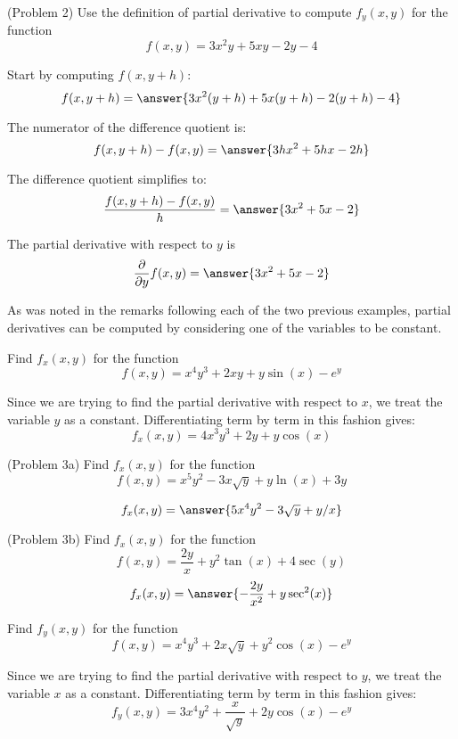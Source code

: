 \documentclass[handout]{ximera}
\begin{document}
\begin{problem}(Problem 2)
Use the definition of partial derivative to compute $f_y(x,y)$ for the function
\[
f(x,y) = 3x^2y + 5xy - 2y - 4
\]

Start by computing $f(x, y+h)$:
\[
f(x, y+h) = \answer{3x^2(y+h) + 5x(y+h) - 2(y+h) - 4}
\]

The numerator of the difference quotient is:
\[
f(x,y+h) - f(x,y) = \answer{3hx^2 + 5hx - 2h}
\]

The difference quotient simplifies to:
\[
\frac{f(x,y+h) - f(x,y)}{h} = \answer{3x^2 + 5x -2}
\]

The partial derivative with respect to $y$ is
\[
\frac{\partial}{\partial y} f(x,y) = \answer{3x^2 + 5x -2}
\]
\end{problem}

As was noted in the remarks following each of the two previous examples, partial derivatives can be computed by considering one of the variables to be constant.

\begin{example}[Example 3]
Find $f_x(x,y)$ for the function 
\[
f(x,y) = x^4y^3 + 2xy + y\sin(x) - e^y
\]

Since we are trying to find the partial derivative with respect to $x$, we treat the variable $y$ as a constant.
Differentiating term by term in this fashion gives:
\[
f_x(x,y) = 4x^3y^3 + 2y + y\cos(x)
\]
\end{example}

\begin{problem}(Problem 3a)
Find $f_x(x,y)$ for the function 
\[
f(x,y) = x^5y^2 - 3x\sqrt y + y\ln(x) + 3y
\]

\[
f_x(x,y) = \answer{5x^4y^2 - 3\sqrt y + y/x}
\]
\end{problem}

\begin{problem}(Problem 3b)
Find $f_x(x,y)$ for the function 
\[
f(x,y) = \frac{2y}{x} + y^2\tan(x) + 4\sec(y)
\]
\[
f_x(x,y) = \answer{-\frac{2y}{x^2} + y\sec^2(x)}
\]
\end{problem}


\begin{example}[Example 4]
Find $f_y(x,y)$ for the function 
\[
f(x,y) = x^4y^3 + 2x\sqrt{y} + y^2\cos(x) - e^y
\]

Since we are trying to find the partial derivative with respect to $y$, we treat the variable $x$ as a constant.
Differentiating term by term in this fashion gives:
\[
f_y(x,y) = 3x^4y^2 + \frac{x}{\sqrt{y}} + 2y\cos(x) - e^y
\]
\end{example}
\end{document}
